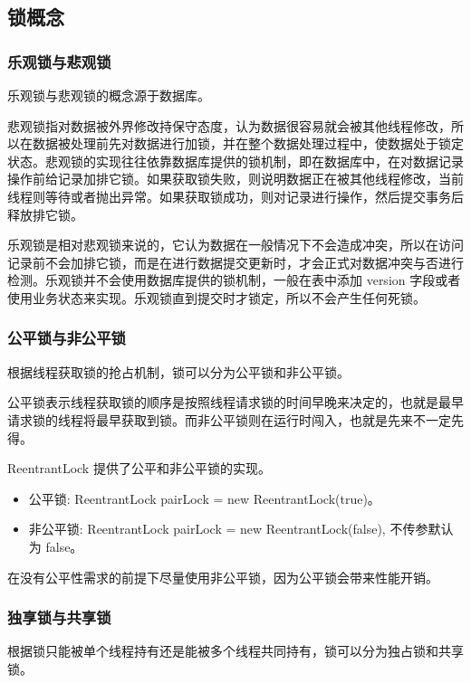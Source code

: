 \subsection{锁概念}

\subsubsection*{乐观锁与悲观锁}

乐观锁与悲观锁的概念源于数据库。

悲观锁指对数据被外界修改持保守态度，认为数据很容易就会被其他线程修改，所以在数据被处理前先对数据进行加锁，并在整个数据处理过程中，使数据处于锁定状态。悲观锁的实现往往依靠数据库提供的锁机制，即在数据库中，在对数据记录操作前给记录加排它锁。如果获取锁失败，则说明数据正在被其他线程修改，当前线程则等待或者抛出异常。如果获取锁成功，则对记录进行操作，然后提交事务后释放排它锁。

乐观锁是相对悲观锁来说的，它认为数据在一般情况下不会造成冲突，所以在访问记录前不会加排它锁，而是在进行数据提交更新时，才会正式对数据冲突与否进行检测。乐观锁并不会使用数据库提供的锁机制，一般在表中添加  version  字段或者使用业务状态来实现。乐观锁直到提交时才锁定，所以不会产生任何死锁。

\subsubsection*{公平锁与非公平锁}

根据线程获取锁的抢占机制，锁可以分为公平锁和非公平锁。

公平锁表示线程获取锁的顺序是按照线程请求锁的时间早晚来决定的，也就是最早请求锁的线程将最早获取到锁。而非公平锁则在运行时闯入，也就是先来不一定先得。

ReentrantLock 提供了公平和非公平锁的实现。
\begin{itemize}
    \item 公平锁: ReentrantLock pairLock = new ReentrantLock(true)。
    \item 非公平锁: ReentrantLock  pairLock  =  new  ReentrantLock(false), 不传参默认为 false。
\end{itemize}

在没有公平性需求的前提下尽量使用非公平锁，因为公平锁会带来性能开销。

\subsubsection*{独享锁与共享锁}

根据锁只能被单个线程持有还是能被多个线程共同持有，锁可以分为独占锁和共享锁。

